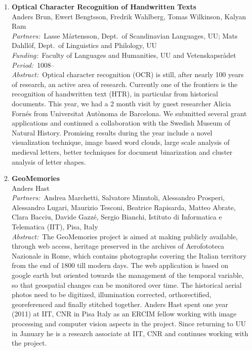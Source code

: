 \documentclass[10pt, a4paper]{article}
\newcommand{\aabstract}[1]{\emph{Abstract:~}#1}
\newcommand{\ffunding}[1]{\emph{Funding:~}#1\\}
\newcommand{\ppartners}[1]{\emph{Partners:~}#1\\}
\newcommand{\pperiod}[1]{\emph{Period:~}#1\\}
\begin{document}
\begin{enumerate}
\item \textbf{Optical Character Recognition of Handwritten Texts}\\
Anders Brun, Ewert Bengtsson, Fredrik Wahlberg, Tomas Wilkinson, Kalyan Ram\\
\ppartners{Lasse M{\aa}rtensson, Dept.~of Scandinavian Languages, UU; Mats Dahll\"{o}f, Dept.~of Linguistics and Philology, UU}
\ffunding{Faculty of Languages and Humanities, UU and Vetenskapsr\r{a}det}
\pperiod{1008--}
\aabstract{Optical character recognition (OCR) is still, after nearly 100 years of research, an active area of research. Currently one of the frontiers is the recognition of handwritten text (HTR), in particular from historical documents. This year, we had a 2 month visit by guest researcher Alicia Forn\' es from Universitat Aut\` onoma de Barcelona. We submitted several grant applications and continued a collaboration with the Swedish Museum of Natural History. Promising results during the year include a novel visualization technique, image based word clouds, large scale analysis of medieval letters, better techniques for document binarization and cluster analysis of letter shapes.}



\item
\label{proj:geomemories}
\textbf{GeoMemories}\\
Anders Hast\\
\ppartners{Andrea Marchetti, Salvatore Minutoli, Alessandro Prosperi, Alessandro Lugari, Maurizio Tesconi, Beatrice Rapisarda, Matteo Abrate, Clara Bacciu, Davide Gazz\'e, Sergio Bianchi, Istituto di Informatica e Telematica (IIT), Pisa, Italy}
\aabstract{The GeoMemories project is aimed at making publicly available, through  web access, heritage preserved in the archives of Aerofototeca  Nazionale in Rome, which contains photographs covering the Italian  territory from the end of 1800 till modern days. The web application  is based on google earth but oriented towards the management of the  temporal variable, so that geospatial changes can be monitored over  time. The historical aerial photos need to be digitized, illumination  corrected, orthorectified, georeferenced and finally stitched together.
Anders Hast spent one year (2011) at IIT, CNR in Pisa Italy as an  ERCIM fellow working with image processing and computer vision aspects  in the project. Since returning to UU in January he is  a research associate at IIT, CNR and continues working with the project.

}
\end{enumerate}
\end{document}
